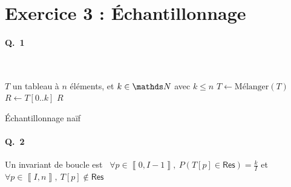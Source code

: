 \section{Exercice 3 : Échantillonnage}

\paragraph{Q.\ 1}~

\begin{algorithm}[H]
	\centering
	\begin{algorithmic}[1]
		\Entree $T$\/ un tableau à $n$\/ éléments, et $k \in \N$\/ avec $k \le n$\/
		\State $T \gets \text{Mélanger}(T)$\/
		\State $R \gets T[0..k]$
		\State\Return $R$\/
	\end{algorithmic}
	\caption{Échantillonnage naïf}
\end{algorithm}

\paragraph{Q.\ 2}
Un invariant de boucle est \guillemotleft~$\forall p \in \left\llbracket 0,I-1 \right\rrbracket,\:P(T[p] \in \textsf{Res}) = \frac{k}{I}$\/ et $\forall p \in \left\llbracket I,n \right\rrbracket,\:T[p] \not\in \textsf{Res}$~\guillemotright

